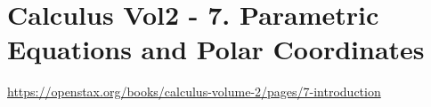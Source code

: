 \section{Calculus Vol2 - 7. Parametric Equations and Polar Coordinates}

\url{https://openstax.org/books/calculus-volume-2/pages/7-introduction}

\clearpage
\clearpage
\clearpage
\clearpage
\clearpage
